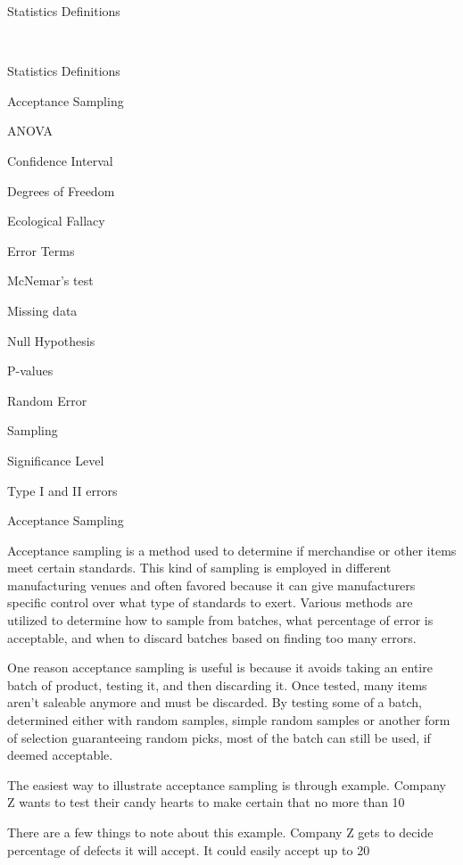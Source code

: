 
Statistics Definitions

 



Statistics Definitions

Acceptance Sampling

ANOVA

Confidence Interval

Degrees of Freedom

Ecological Fallacy

Error Terms

McNemar's test

Missing data

Null Hypothesis

P-values

Random Error

Sampling

Significance Level

Type I and II errors


Acceptance Sampling

Acceptance sampling is a method used to determine if merchandise or other items meet certain standards. This kind of sampling is employed in different manufacturing venues and often favored because it can give manufacturers specific control over what type of standards to exert. Various methods are utilized to determine how to sample from batches, what percentage of error is acceptable, and when to discard batches based on finding too many errors.


One reason acceptance sampling is useful is because it avoids taking an entire batch of product, testing it, and then discarding it. Once tested, many items aren’t saleable anymore and must be discarded. By testing some of a batch, determined either with random samples, simple random samples or another form of selection guaranteeing random picks, most of the batch can still be used, if deemed acceptable.


The easiest way to illustrate acceptance sampling is through example. Company Z wants to test their candy hearts to make certain that no more than 10%


There are a few things to note about this example. Company Z gets to decide percentage of defects it will accept. It could easily accept up to 20%


